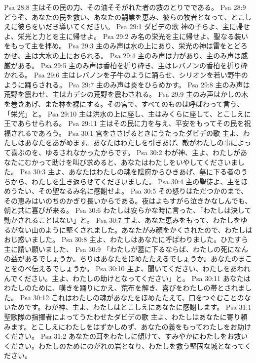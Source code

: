 Psa 28:8  主はその民の力、その油そそがれた者の救のとりでである。
Psa 28:9  どうぞ、あなたの民を救い、あなたの嗣業を恵み、彼らの牧者となって、とこしえに彼らをいだき導いてください。
Psa 29:1  ダビデの歌 神の子らよ、主に帰せよ、栄光と力とを主に帰せよ。
Psa 29:2  み名の栄光を主に帰せよ、聖なる装いをもって主を拝め。
Psa 29:3  主のみ声は水の上にあり、栄光の神は雷をとどろかせ、主は大水の上におられる。
Psa 29:4  主のみ声は力があり、主のみ声は威厳がある。
Psa 29:5  主のみ声は香柏を折り砕き、主はレバノンの香柏を折り砕かれる。
Psa 29:6  主はレバノンを子牛のように踊らせ、シリオンを若い野牛のように踊らされる。
Psa 29:7  主のみ声は炎をひらめかす。
Psa 29:8  主のみ声は荒野を震わせ、主はカデシの荒野を震わされる。
Psa 29:9  主のみ声はかしの木を巻きあげ、また林を裸にする。その宮で、すべてのものは呼ばわって言う、「栄光」と。
Psa 29:10  主は洪水の上に座し、主はみくらに座して、とこしえに王であらせられる。
Psa 29:11  主はその民に力を与え、平安をもってその民を祝福されるであろう。
Psa 30:1  宮をささげるときにうたったダビデの歌 主よ、わたしはあなたをあがめます。あなたはわたしを引きあげ、敵がわたしの事によって喜ぶのを、ゆるされなかったからです。
Psa 30:2  わが神、主よ、わたしがあなたにむかって助けを叫び求めると、あなたはわたしをいやしてくださいました。
Psa 30:3  主よ、あなたはわたしの魂を陰府からひきあげ、墓に下る者のうちから、わたしを生き返らせてくださいました。
Psa 30:4  主の聖徒よ、主をほめうたい、その聖なるみ名に感謝せよ。
Psa 30:5  その怒りはただつかのまで、その恵みはいのちのかぎり長いからである。夜はよもすがら泣きかなしんでも、朝と共に喜びが来る。
Psa 30:6  わたしは安らかな時に言った、「わたしは決して動かされることはない」と。
Psa 30:7  主よ、あなた恵みをもって、わたしをゆるがない山のように堅くされました。あなたがみ顔をかくされたので、わたしはおじ惑いました。
Psa 30:8  主よ、わたしはあなたに呼ばわりました。ひたすら主に請い願いました、
Psa 30:9  「わたしが墓に下るならば、わたしの死になんの益があるでしょうか。ちりはあなたをほめたたえるでしょうか。あなたのまことをのべ伝えるでしょうか。
Psa 30:10  主よ、聞いてください、わたしをあわれんでください。主よ、わたしの助けとなってください」と。
Psa 30:11  あなたはわたしのために、嘆きを踊りにかえ、荒布を解き、喜びをわたしの帯とされました。
Psa 30:12  これはわたしの魂があなたをほめたたえて、口をつぐむことのないためです。わが神、主よ、わたしはとこしえにあなたに感謝します。
Psa 31:1  聖歌隊の指揮者によってうたわせたダビデの歌 主よ、わたしはあなたに寄り頼みます。とこしえにわたしをはずかしめず、あなたの義をもってわたしをお助けください。
Psa 31:2  あなたの耳をわたしに傾けて、すみやかにわたしをお救いください。わたしのためにのがれの岩となり、わたしを救う堅固な城となってください。
